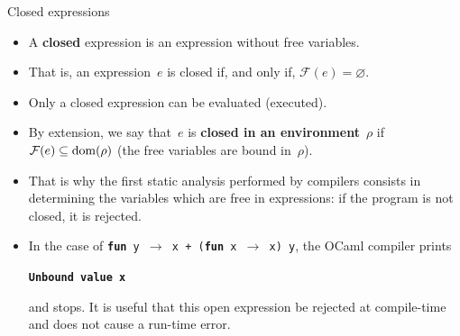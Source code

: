 \documentclass[compress,dvipdfmx]{beamer}
\newcommand{\OCaml}{\textsf{OCaml}\xspace}
\newcommand\FV[1]{\mathcal{F}({#1})}
\begin{document}
%
\begin{frame}{Closed expressions}

  \begin{itemize}

    \item A \textbf{closed} expression is an expression without free
      variables.

    \item That is, an expression~\(e\) is closed if, and only if,
      \(\FV{e} = \varnothing\).

    \item Only a closed expression can be evaluated (executed).

    \item By extension, we say that~\(e\) is \textbf{closed in an
      environment}~\(\rho\) if \(\FV{e} \subseteq \dom{\rho}\) (the
      free variables are bound in~\(\rho\)).

    \item That is why the first static analysis performed by compilers
      consists in determining the variables which are free in
      expressions: if the program is not closed, it is rejected.

    \item In the case of \texttt{\small \textbf{fun} y \(\rightarrow\)
      x + (\textbf{fun} x \(\rightarrow\) x) y}, the \OCaml compiler
      prints
      \begin{center}
        \texttt{\small \textbf{Unbound value x}}
      \end{center}
      and stops. It is useful that this open expression be rejected at
      compile\hyp{}time and does not cause a run\hyp{}time error.

  \end{itemize}

\end{frame}
\end{document}
